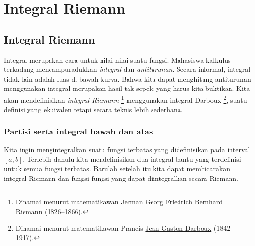 \chapter{Integral Riemann} \label{int:chapter}


\section{Integral Riemann}
\label{sec:rint}



Integral merupakan cara untuk  nilai-nilai suatu fungsi.
Mahasiswa kalkulus terkadang mencampuradukkan
\emph{integral} dan \emph{antiturunan}.
Secara informal, integral tidak lain adalah luas di bawah kurva.
Bahwa kita dapat menghitung antiturunan menggunakan integral merupakan hasil
tak sepele yang harus kita buktikan.
Kita akan mendefinisikan \emph{integral Riemann}%
\footnote{Dinamai menurut matematikawan Jerman
\href{https://en.wikipedia.org/wiki/Riemann}{Georg Friedrich Bernhard Riemann}
(1826--1866).}
menggunakan integral Darboux%
\footnote{Dinamai menurut matematikawan Prancis
\href{https://en.wikipedia.org/wiki/Darboux}{Jean-Gaston Darboux} (1842--1917).},
suatu definisi yang ekuivalen tetapi secara teknis lebih sederhana.

\subsection{Partisi serta integral bawah dan atas}

Kita ingin mengintegralkan suatu fungsi terbatas yang didefinisikan pada interval $[a,b]$.
Terlebih dahulu kita mendefinisikan dua integral bantu yang terdefinisi untuk semua
fungsi terbatas.  Barulah setelah itu kita dapat membicarakan integral Riemann dan
fungsi-fungsi yang dapat diintegralkan secara Riemann.

